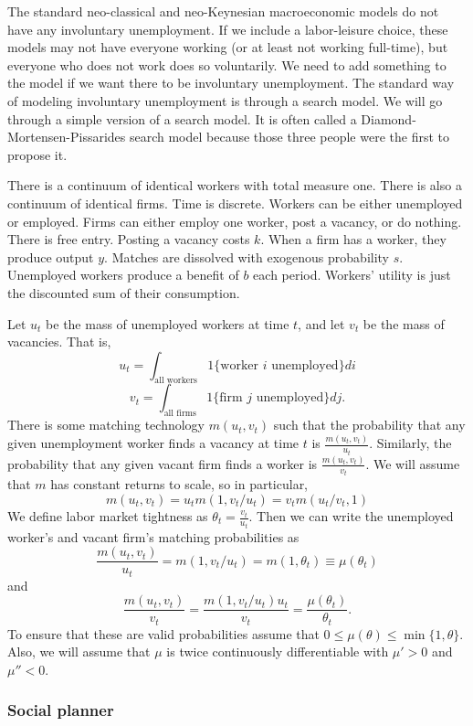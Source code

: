 \documentclass[12pt,reqno]{amsart}
\theoremstyle{definition}
\begin{document}
The standard neo-classical and neo-Keynesian macroeconomic models do
not have any involuntary unemployment. If we include a labor-leisure
choice, these models may not have everyone working (or at least not
working full-time), but everyone who does not work does so
voluntarily. We need to add something to the model if we want there to
be involuntary unemployment. The standard way of modeling
involuntary unemployment is through a search model. We will go through
a simple version of a search model. It is often called a
Diamond-Mortensen-Pissarides search model because those three people
were the first to propose it. 

There is a continuum of identical workers with total measure
one. There is also a continuum of identical firms. Time is
discrete. Workers can be either unemployed or employed. Firms can
either employ one worker, post a vacancy, or do nothing. There is free
entry. Posting a vacancy costs $k$. When a firm has a worker, they
produce output $y$. Matches are dissolved with exogenous probability
$s$. Unemployed workers produce a benefit of $b$ each period. Workers'
utility is just the discounted sum of their consumption.

Let $u_t$ be the mass of unemployed workers at time $t$, and let $v_t$
be the mass of vacancies. That is,
\[ u_t = \int_{\text{all workers}} 1\{\text{worker $i$ unemployed}\} di \]
\[ v_t = \int_{\text{all firms}} 1\{\text{firm $j$ unemployed}\} dj. \]
There is some matching technology $m(u_t,v_t)$ such that the
probability that any given unemployment worker finds a vacancy at time
$t$ is $\frac{m(u_t,v_t)}{u_t}$. Similarly, the probability that any
given vacant firm finds a worker is $\frac{m(u_t,v_t)}{v_t}$. We will
assume that $m$ has constant returns to scale, so in particular,
\[ m(u_t,v_t) = u_t m(1,v_t/u_t) = v_t m(u_t/v_t,1) \]
We define labor market tightness as $\theta_t = \frac{v_t}{u_t}$. Then
we can write the unemployed worker's and vacant firm's matching
probabilities as 
\[ \frac{m(u_t,v_t)}{u_t} = m(1,v_t/u_t) = m(1,\theta_t) \equiv
\mu(\theta_t) \]
and 
\[ \frac{m(u_t,v_t)}{v_t} = \frac{m(1,v_t/u_t)u_t}{v_t} =
\frac{\mu(\theta_t)}{\theta_t}. \] 
To ensure that these are valid probabilities assume that $0 \leq \mu(\theta)
\leq \min\{1,\theta\}$. Also, we will assume that $\mu$ is twice
continuously differentiable with $\mu'>0$ and $\mu''<0$. 

\subsubsection{Social planner}
\end{document}
